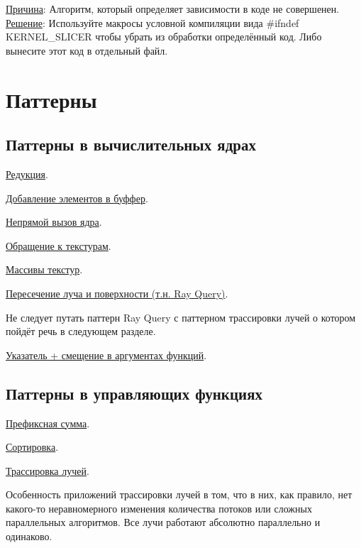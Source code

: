 \documentclass[11pt,fleqn,english,russian]{report} %
\begin{document}
\noindent\underline{Причина}: Алгоритм, который определяет зависимости в коде не совершенен. \underline{Решение}: Используйте макросы условной компиляции вида \#ifndef KERNEL\_SLICER чтобы убрать из обработки определённый код. Либо вынесите этот код в отдельный файл.  


\chapter{Паттерны}\label{patterns}

\section{Паттерны в вычислительных ядрах}

\noindent\underline{Редукция}.

\noindent\underline{Добавление элементов в буффер}.

\noindent\underline{Непрямой вызов ядра}.

\noindent\underline{Обращение к текстурам}.

\noindent\underline{Массивы текстур}.

\noindent\underline{Пересечение луча и поверхности (т.н. Ray Query)}.

\begin{remark}
Не следует путать паттерн Ray Query с паттерном трассировки лучей о котором пойдёт речь в следующем разделе. 
\end{remark}

\noindent\underline{Указатель + смещение в аргументах функций}.

\section{Паттерны в управляющих функциях}

\noindent\underline{Префиксная сумма}.

\noindent\underline{Сортировка}.

\noindent\underline{Трассировка лучей}.

Особенность приложений трассировки лучей в том, что в них, как правило, нет какого-то неравномерного изменения количества потоков или сложных параллельных алгоритмов. Все лучи работают абсолютно параллельно и одинаково.
\end{document}
